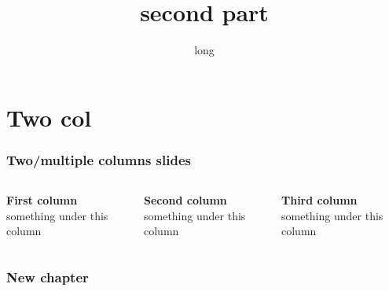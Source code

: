 \documentclass[12pt]{beamer}
\title[second]{second part}
\author{}
\date[short]{long}
\begin{document}
\frame{\titlepage}



\section{Two col}
\begin{frame}
\frametitle{Two/multiple columns slides}


\begin{columns}

\begin{column}{0.3\textwidth}%
{\textbf {First column}}\\
something under this column
\end{column}

\begin{column}{0.3\textwidth}%
{\textbf {Second column}}\\
something under this column
\end{column}

\begin{column}{0.3\textwidth}%
{\textbf {Third column}}\\
something under this column
\end{column}


\end{columns}



\end{frame}


\begin{frame}
\frametitle{New chapter}


\end{frame}
\end{document}
